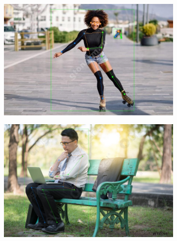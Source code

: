 \begin{figure}[h]
\begin{subfigure}[b]{.5\textwidth}
	\centering
	\includegraphics[width=\textwidth]{./images/MMPose/19}
	\caption{ }
\end{subfigure}
\begin{subfigure}[b]{.5\textwidth}
	\centering
    \includegraphics[width=\textwidth]{./images/MMPose/23}
    \caption{ }
\end{subfigure}
\begin{subfigure}[b]{.5\textwidth}
	\centering

\end{subfigure}
\end{figure}
